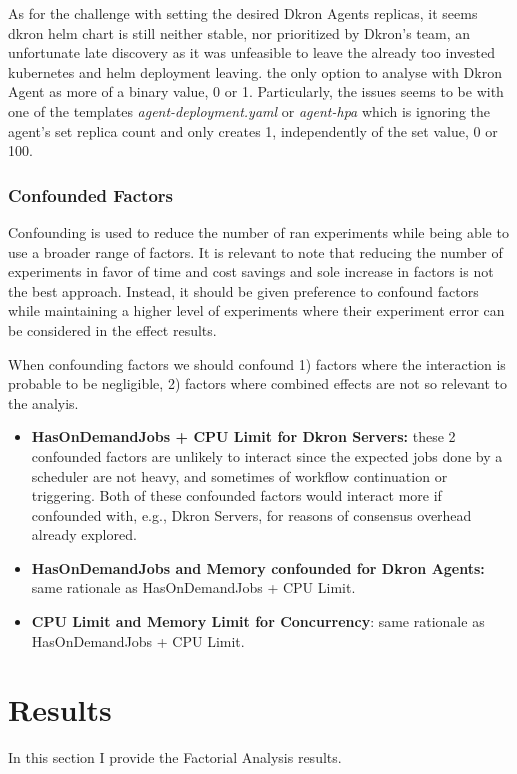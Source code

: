 \documentclass[runningheads]{llncs}
\begin{document}
As for the challenge with setting the desired Dkron Agents replicas, it seems dkron helm chart
is still neither stable, nor prioritized by Dkron's team, an unfortunate late discovery
as it was unfeasible to leave the already too invested kubernetes and helm deployment leaving.
the only option to analyse with Dkron Agent as more of a binary value, 0 or 1.
Particularly, the issues seems to be with one of the templates \textit{agent-deployment.yaml} or
\textit{agent-hpa} which is ignoring the agent's set replica count and only creates 1,
independently of the set value, 0 or 100.



\subsubsection{Confounded Factors}
Confounding is used to reduce the number of ran experiments while being able to use a broader range
of factors. It is relevant to note that reducing the number of experiments in favor of time and cost savings
and sole increase in factors is not the best approach. Instead, it should be given preference to confound
factors while maintaining a higher level of experiments where their experiment error can be considered
in the effect results.

When confounding factors we should confound 1) factors where the interaction is probable to be negligible,
2) factors where combined effects are not so relevant to the analyis.

\begin{itemize}
    \item \textbf{HasOnDemandJobs + CPU Limit for Dkron Servers:} these 2 confounded factors are unlikely to interact since the expected jobs done by
        a scheduler are not heavy, and sometimes of workflow continuation or triggering.
        Both of these confounded factors would interact more if confounded with, e.g., Dkron Servers,
        for reasons of consensus overhead already explored.
    \item \textbf{HasOnDemandJobs and Memory confounded for Dkron Agents:} same rationale as
    HasOnDemandJobs + CPU Limit.
    \item \textbf{CPU Limit and Memory Limit for Concurrency}: same rationale as HasOnDemandJobs
    + CPU Limit.
\end{itemize}



\section{Results}
\label{results}
In this section I provide the Factorial Analysis results.
\end{document}
